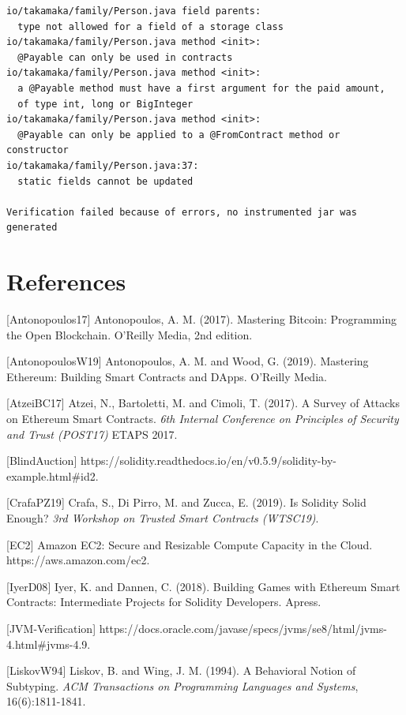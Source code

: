 \documentclass[a4paper,]{book}
\begin{document}
{\begin{myverbatim}
\begin{verbatim}
io/takamaka/family/Person.java field parents:
  type not allowed for a field of a storage class
io/takamaka/family/Person.java method <init>:
  @Payable can only be used in contracts
io/takamaka/family/Person.java method <init>:
  a @Payable method must have a first argument for the paid amount,
  of type int, long or BigInteger
io/takamaka/family/Person.java method <init>:
  @Payable can only be applied to a @FromContract method or constructor
io/takamaka/family/Person.java:37:
  static fields cannot be updated

Verification failed because of errors, no instrumented jar was generated
\end{verbatim}
\end{myverbatim}

\hypertarget{references}{%
\chapter{References }\label{references}}

{[}Antonopoulos17{]} Antonopoulos, A. M. (2017). Mastering Bitcoin:
Programming the Open Blockchain. O'Reilly Media, 2nd edition.

{[}AntonopoulosW19{]} Antonopoulos, A. M. and Wood, G. (2019). Mastering
Ethereum: Building Smart Contracts and DApps. O'Reilly Media.

{[}AtzeiBC17{]} Atzei, N., Bartoletti, M. and Cimoli, T. (2017). A
Survey of Attacks on Ethereum Smart Contracts. \emph{6th Internal
Conference on Principles of Security and Trust (POST17)} ETAPS 2017.

{[}BlindAuction{]}
https://solidity.readthedocs.io/en/v0.5.9/solidity-by-example.html\#id2.

{[}CrafaPZ19{]} Crafa, S., Di Pirro, M. and Zucca, E. (2019). Is
Solidity Solid Enough? \emph{3rd Workshop on Trusted Smart Contracts
(WTSC19)}.

{[}EC2{]} Amazon EC2: Secure and Resizable Compute Capacity in the
Cloud. https://aws.amazon.com/ec2.

{[}IyerD08{]} Iyer, K. and Dannen, C. (2018). Building Games with
Ethereum Smart Contracts: Intermediate Projects for Solidity Developers.
Apress.

{[}JVM-Verification{]}
https://docs.oracle.com/javase/specs/jvms/se8/html/jvms-4.html\#jvms-4.9.

{[}LiskovW94{]} Liskov, B. and Wing, J. M. (1994). A Behavioral Notion
of Subtyping. \emph{ACM Transactions on Programming Languages and
Systems}, 16(6):1811-1841.

}
\end{document}
